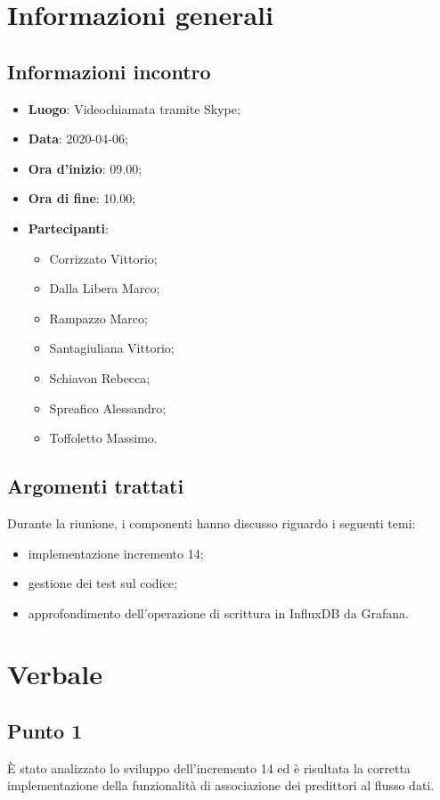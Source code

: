 \section{Informazioni generali}
    \subsection{Informazioni incontro}
        \begin{itemize}
            \item \textbf{Luogo}: Videochiamata tramite Skype;
            \item \textbf{Data}: 2020-04-06;
            \item \textbf{Ora d'inizio}: 09.00;
            \item \textbf{Ora di fine}: 10.00;
            \item \textbf{Partecipanti}: \begin{itemize}
                \item Corrizzato Vittorio;
                \item Dalla Libera Marco;
                \item Rampazzo Marco;
                \item Santagiuliana Vittorio;
                \item Schiavon Rebecca;
                \item Spreafico Alessandro;
                \item Toffoletto Massimo.
            \end{itemize}
        \end{itemize}
    \subsection{Argomenti trattati}
        Durante la riunione, i componenti hanno discusso riguardo i seguenti temi:
        \begin{itemize}
            \item implementazione incremento 14;
            \item gestione dei test sul codice;
            \item approfondimento dell'operazione di scrittura in InfluxDB da Grafana\glo.
        \end{itemize}
\section{Verbale}
    \subsection{Punto 1}
        È stato analizzato lo sviluppo dell'incremento 14 ed è risultata la corretta implementazione della funzionalità di associazione dei predittori al flusso dati.
